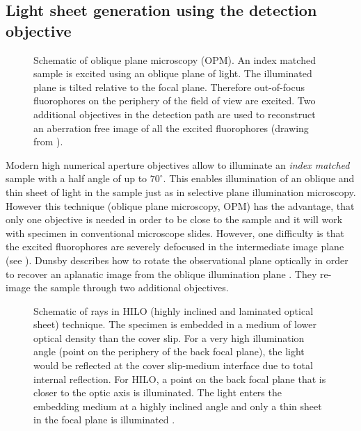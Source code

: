 \subsection{Light sheet generation using the detection objective}
\label{sec:hilo}
\begin{figure}[!hbt]
  \centering
  \caption{Schematic of oblique plane microscopy (OPM). An index
    matched sample is excited using an oblique plane of light. The
    illuminated plane is tilted relative to the focal plane. Therefore
    out-of-focus fluorophores on the periphery of the field of view
    are excited. Two additional objectives in the detection path are
    used to reconstruct an aberration free image of all the excited
    fluorophores (drawing from \cite{Dunsby2008}).}
  \label{fig:dunsby}
\end{figure}
Modern high numerical aperture objectives allow to illuminate an
\emph{index matched} sample with a half angle of up to
$70^\circ$. This enables illumination of an oblique and thin sheet of
light in the sample just as in selective plane illumination
microscopy. However this technique (oblique plane microscopy, OPM) has
the advantage, that only one objective is needed in order to be close
to the sample and it will work with specimen in conventional
microscope slides. However, one difficulty is that the excited
fluorophores are severely defocused in the intermediate image plane
(see ). Dunsby describes how to rotate the
observational plane optically in order to recover an aplanatic image
from the oblique illumination plane \citep{Dunsby2008}. They re-image
the sample through two additional objectives.


\begin{figure}[!hbt]
  \centering
  
  \caption{Schematic of rays in HILO (highly inclined and laminated
    optical sheet) technique. The specimen is embedded in a medium of
    lower optical density than the cover slip. For a very high
    illumination angle (point on the periphery of the back focal
    plane), the light would be reflected at the cover slip-medium
    interface due to total internal reflection. For HILO, a point on
    the back focal plane that is closer to the optic axis is
    illuminated. The light enters the embedding medium at a highly
    inclined angle and only a thin sheet in the focal plane is
    illuminated \citep[inspired from][]{Tokunaga2008}.}
  \label{fig:hilo}
\end{figure}

